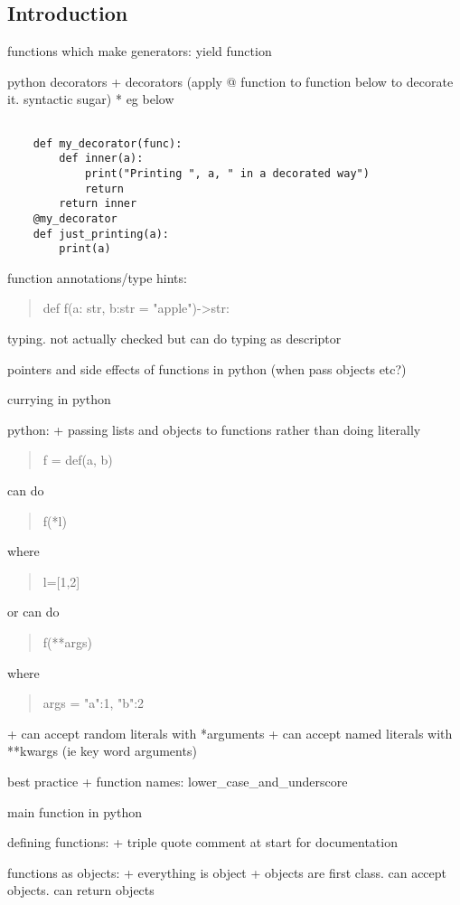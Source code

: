 
\subsection{Introduction}

functions which make generators: yield function

python decorators
+ decorators (apply @ function to function below to decorate it. syntactic sugar)
  * eg below

\begin{verbatim}

    def my_decorator(func):
        def inner(a):
            print("Printing ", a, " in a decorated way")
            return
        return inner
    @my_decorator
    def just_printing(a):
        print(a)

\end{verbatim}

function annotations/type hints:

\begin{quote}
def f(a: str, b:str = "apple")->str:
\end{quote}

typing. not actually checked but can do typing as descriptor

pointers and side effects of functions in python (when pass objects etc?)

currying in python

python:
+ passing lists and objects to functions rather than doing literally

\begin{quote}
    f = def(a, b)
\end{quote}
can do
\begin{quote}
    f(*l)
\end{quote}
where
\begin{quote}
    l=[1,2]
\end{quote}


or can do
\begin{quote}
    f(**args)
\end{quote}

where

\begin{quote}
    args = {"a":1, "b":2}
\end{quote}
+ can accept random literals with *arguments
+ can accept named literals with **kwargs (ie key word arguments)

best practice
+ function names: lower\_case\_and\_underscore

main function in python

defining functions:
+ triple quote comment at start for documentation

functions as objects:
+ everything is object
+ objects are first class. can accept objects. can return objects
